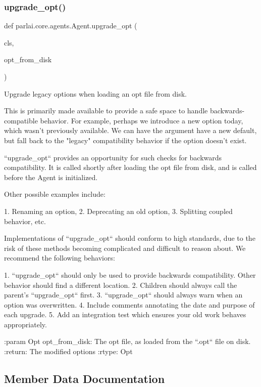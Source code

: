\subsubsection{\texorpdfstring{upgrade\+\_\+opt()}{upgrade\_opt()}}
{\footnotesize\ttfamily def parlai.\+core.\+agents.\+Agent.\+upgrade\+\_\+opt (\begin{DoxyParamCaption}\item[{}]{cls,  }\item[{}]{opt\+\_\+from\+\_\+disk }\end{DoxyParamCaption})}

\begin{DoxyVerb}Upgrade legacy options when loading an opt file from disk.

This is primarily made available to provide a safe space to handle
backwards-compatible behavior. For example, perhaps we introduce a
new option today, which wasn't previously available. We can have the
argument have a new default, but fall back to the "legacy" compatibility
behavior if the option doesn't exist.

``upgrade_opt`` provides an opportunity for such checks for backwards
compatibility. It is called shortly after loading the opt file from
disk, and is called before the Agent is initialized.

Other possible examples include:

    1. Renaming an option,
    2. Deprecating an old option,
    3. Splitting coupled behavior, etc.

Implementations of ``upgrade_opt`` should conform to high standards,
due to the risk of these methods becoming complicated and difficult to
reason about. We recommend the following behaviors:

    1. ``upgrade_opt`` should only be used to provide backwards
    compatibility.  Other behavior should find a different location.
    2. Children should always call the parent's ``upgrade_opt`` first.
    3. ``upgrade_opt`` should always warn when an option was overwritten.
    4. Include comments annotating the date and purpose of each upgrade.
    5. Add an integration test which ensures your old work behaves
    appropriately.

:param Opt opt_from_disk:
    The opt file, as loaded from the ``.opt`` file on disk.
:return:
    The modified options
:rtype:
    Opt
\end{DoxyVerb}
 

\subsection{Member Data Documentation}
\mbox{\label{classparlai_1_1core_1_1agents_1_1Agent_ac00c13f4c7dd1263bf9203fa96dd2366}} 
